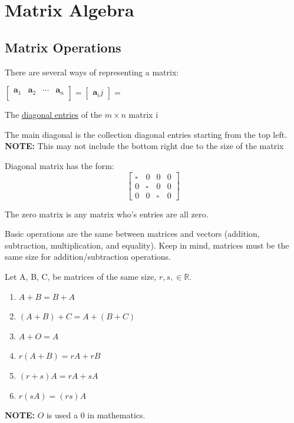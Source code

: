 \documentclass{report}
\begin{document}
\chapter{Matrix Algebra}

\section{Matrix Operations}
There are several ways of representing a matrix:\\
\begin{center}
$\begin{bmatrix}
\mathbf{a}_1 & \mathbf{a}_2 & \dotsb & \mathbf{a}_n \\ 
\end{bmatrix}
=
\begin{bmatrix}
\mathbf{a}_ij
\end{bmatrix}
=
$
\end{center}
\begin{definition}
The \underline{diagonal entries} of the $m \times n$ matrix i
\end{definition}

\begin{definition}
The main diagonal is the collection diagonal entries starting from the top left. \textbf{NOTE:} This may not include the bottom right due to the size of the matrix
\end{definition}

\begin{definition}
Diagonal matrix has the form:
\begin{equation*}
	\begin{bmatrix}
	\square & 0 & 0 & 0 \\ 
	0 & \square & 0 & 0 \\ 
	0 & 0 & \square & 0
	\end{bmatrix}
\end{equation*}
\end{definition}

\begin{definition}
The zero matrix is any matrix who's entries are all zero.
\end{definition}

Basic operations are the same between matrices and vectors (addition, subtraction, multiplication, and equality). Keep in mind, matrices must be the same size for addition/subtraction operations.

\begin{theorem}
Let A, B, C, be matrices of the same size, $r,s,\in \mathbb{R}$.
\begin{enumerate}
	\item $A+B = B+A$
	\item $(A + B) + C = A + (B + C)$
	\item $A + O = A$
	\item $r(A +B) = rA +rB$
	\item $(r +s)A = rA +sA$
	\item $r(sA) = (rs)A$
\end{enumerate}
\textbf{NOTE:} $O$ is used a 0 in mathematics.
\end{theorem}
\end{document}
